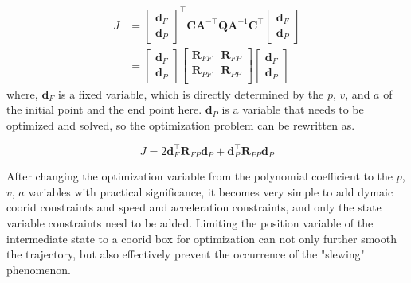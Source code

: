 \documentclass[conference]{IEEEtran}
\begin{document}
    \begin{equation}
        \begin{aligned}
            J &= 
            \begin{bmatrix}
            \boldsymbol{d}_{F} \\
            \boldsymbol{d}_{P{}}
            \end{bmatrix} ^{\top}
            \boldsymbol{C}\boldsymbol{A}^{-\top}
            \boldsymbol{Q} \boldsymbol{A}^{-1}
            \boldsymbol{C}^{\top}
            \begin{bmatrix}
            \boldsymbol{d}_{F} \\
            \boldsymbol{d}_{P}
            \end{bmatrix} \\
            &=
            \begin{bmatrix}
            \boldsymbol{d}_{F} \\
            \boldsymbol{d}_{P}
            \end{bmatrix}
            \begin{bmatrix}
            \boldsymbol{R}_{FF} &\boldsymbol{R}_{FP}\\
            \boldsymbol{R}_{PF} &\boldsymbol{R}_{PP}\\
            \end{bmatrix}
            \begin{bmatrix}
            \boldsymbol{d}_{F} \\
            \boldsymbol{d}_{P}
            \end{bmatrix}
        \end{aligned}
    \end{equation}
    where, $\boldsymbol{d}_{F}$ is a fixed variable, which is directly determined by the $p$, $v$, and $a$ of the initial point and the end point here. $\boldsymbol{d}_{P}$ is a variable that needs to be optimized and solved, so the optimization problem can be rewritten as.

    \begin{equation}
        J = 2\boldsymbol{d}_{F}^{\top}\boldsymbol{R}_{FP}\boldsymbol{d}_{P} + \boldsymbol{d}_{P}^{\top}\boldsymbol{R}_{PP}\boldsymbol{d}_{P} 
    \end{equation}

    After changing the optimization variable from the polynomial coefficient to the $p$, $v$, $a$ variables with practical significance, it becomes very simple to add dymaic coorid constraints and speed and acceleration constraints, and only the state variable constraints need to be added. Limiting the position variable of the intermediate state to a coorid box for optimization can not only further smooth the trajectory, but also effectively prevent the occurrence of the "slewing" phenomenon.
\end{document}
